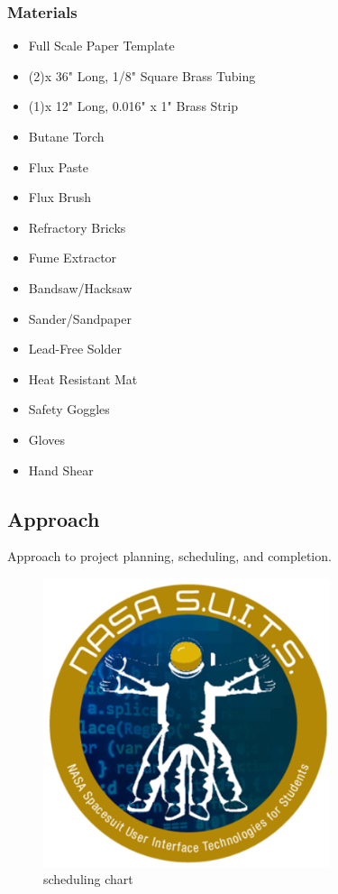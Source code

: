 \documentclass{article}
\let\Oldsubsection\subsection
\renewcommand{\subsection}{\FloatBarrier\Oldsubsection}
\let\Oldsubsubsection\subsubsection
\renewcommand{\subsubsection}{\FloatBarrier\Oldsubsubsection}
\begin{document}
  \subsubsection{Materials}
  \begin{itemize}
  \item Full Scale Paper Template
  \item (2)x 36" Long, 1/8" Square Brass Tubing
  \item (1)x 12" Long, 0.016" x 1" Brass Strip
  \item Butane Torch
  \item Flux Paste
  \item Flux Brush
  \item Refractory Bricks
  \item Fume Extractor
  \item Bandsaw/Hacksaw
  \item Sander/Sandpaper
  \item Lead-Free Solder
  \item Heat Resistant Mat
  \item Safety Goggles
  \item Gloves
  \item Hand Shear
  \end{itemize}

  \subsection{Approach}

  Approach to project planning, scheduling, and completion.

  \begin{figure}[!htb]
    \centering
    \includegraphics[width=0.75\textwidth]{assets/logo.png}
    \caption{scheduling chart}
    \label{fig:spacesuitdisplay}
  \end{figure}
\end{document}
